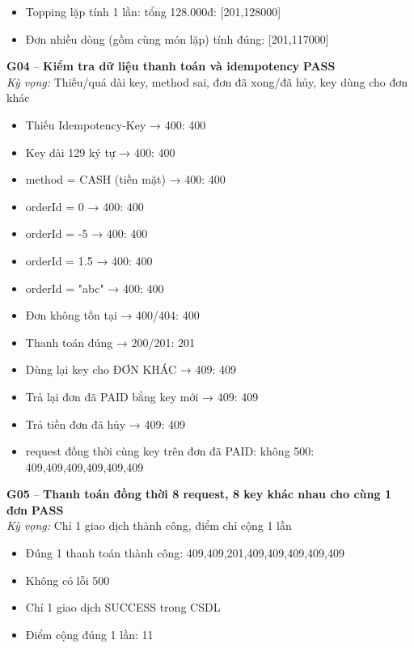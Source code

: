 \documentclass[a4paper,11pt]{article}
\newcommand{\ok}{\textcolor{okgreen}{\textbf{PASS}}}
\begin{document}
\begin{itemize}\footnotesize
\item \tick Topping lặp tính 1 lần: tổng 128.000đ: [201,128000]
\item \tick Đơn nhiều dòng (gồm cùng món lặp) tính đúng: [201,117000]
\end{itemize}
\begin{minipage}{\textwidth}\vspace{4pt}\textbf{\textcolor{brew}{G04}} -- \textbf{Kiểm tra dữ liệu thanh toán và idempotency} \hfill \ok\\
{\small\emph{Kỳ vọng:} Thiếu/quá dài key, method sai, đơn đã xong/đã hủy, key dùng cho đơn khác}
\end{minipage}
\begin{itemize}\footnotesize
\item \tick Thiếu Idempotency-Key → 400: 400
\item \tick Key dài 129 ký tự → 400: 400
\item \tick method = CASH (tiền mặt) → 400: 400
\item \tick orderId = 0 → 400: 400
\item \tick orderId = -5 → 400: 400
\item \tick orderId = 1.5 → 400: 400
\item \tick orderId = "abc" → 400: 400
\item \tick Đơn không tồn tại → 400/404: 400
\item \tick Thanh toán đúng → 200/201: 201
\item \tick Dùng lại key cho ĐƠN KHÁC → 409: 409
\item \tick Trả lại đơn đã PAID bằng key mới → 409: 409
\item \tick Trả tiền đơn đã hủy → 409: 409
\item {} request đồng thời cùng key trên đơn đã PAID: không 500: 409,409,409,409,409,409
\end{itemize}
\begin{minipage}{\textwidth}\vspace{4pt}\textbf{\textcolor{brew}{G05}} -- \textbf{Thanh toán đồng thời 8 request, 8 key khác nhau cho cùng 1 đơn} \hfill \ok\\
{\small\emph{Kỳ vọng:} Chỉ 1 giao dịch thành công, điểm chỉ cộng 1 lần}
\end{minipage}
\begin{itemize}\footnotesize
\item \tick Đúng 1 thanh toán thành công: 409,409,201,409,409,409,409,409
\item \tick Không có lỗi 500
\item \tick Chỉ 1 giao dịch SUCCESS trong CSDL
\item \tick Điểm cộng đúng 1 lần: 11
\end{itemize}
\end{document}
